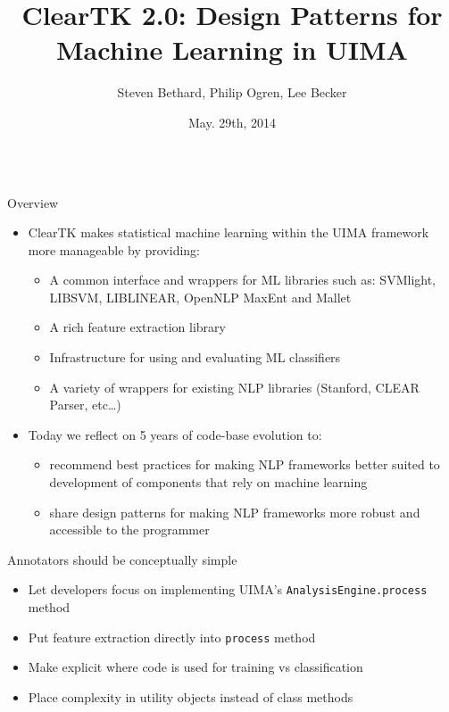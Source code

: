 \documentclass[final]{beamer}
\title{\Huge ClearTK 2.0: Design Patterns for Machine Learning in UIMA\\[0.2ex]}
\author{Steven Bethard\inst{1}, Philip Ogren\inst{2}, Lee Becker\inst{2}}
\institute[] %
{
  \inst{1}%
  University of Alabama at Birmingham, Birmingham, AL, USA
  \\
  \inst{2}%
  University of Colorado Boulder, Boulder, CO, USA
}
\date[May. 29th, 2014]{May. 29th, 2014}
\newcommand{\code}[1]{\texttt{\small #1}}
\begin{document}
\begin{frame}[fragile]

\vspace{-1cm}
\begin{columns}[t]
  \begin{column}{.45\linewidth}
    \begin{block}{Overview}
      \begin{itemize}
      \item ClearTK makes statistical machine learning within the UIMA framework more manageable by providing:

        \begin{itemize}
        \item A common interface and wrappers for ML libraries such as: SVMlight, LIBSVM, LIBLINEAR, OpenNLP MaxEnt and Mallet
        \item A rich feature extraction library
        \item Infrastructure for using and evaluating ML classifiers
        \item A variety of wrappers for existing NLP libraries (Stanford, CLEAR Parser, etc\ldots)
        \end{itemize}

      \item Today we reflect on 5 years of code-base evolution to:
        \begin{itemize}
        \item recommend best practices for making NLP frameworks better suited to development of components that rely on machine learning 
        \item share design patterns for making NLP frameworks more robust and accessible to the programmer
        \end{itemize}
      \end{itemize}
    \end{block}
    

    \begin{block}{Annotators should be conceptually simple}
      \begin{itemize}
      \item Let developers focus on implementing UIMA's \code{AnalysisEngine.process} method
      \item Put feature extraction directly into \code{process} method
      \item Make explicit where code is used for training vs classification
      \item Place complexity in utility objects instead of class methods


\end{itemize}
\end{block}
\end{column}
\end{columns}
\end{frame}
\end{document}
